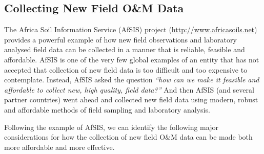 \documentclass[graybox,natbib,nospthms,UStrade]{svmono}
\begin{document}
\hypertarget{collecting-new-field-om-data}{%
\subsection{Collecting New Field O\&M Data}\label{collecting-new-field-om-data}}

The Africa Soil Information Service (AfSIS) project
(\url{http://www.africasoils.net}) provides a
powerful example of how new field observations and laboratory analysed
field data can be collected in a manner that is reliable, feasible and
affordable. AfSIS is one of the very few global examples of an entity
that has not accepted that collection of new field data is too difficult
and too expensive to contemplate. Instead, AfSIS asked the question \emph{``how
can we make it feasible and affordable to collect new, high quality,
field data?''} And then AfSIS (and several partner countries) went ahead
and collected new field data using modern, robust and affordable methods
of field sampling and laboratory analysis.

Following the example of AfSIS, we can identify the following major
considerations for how the collection of new field O\&M data can be made
both more affordable and more effective.
\end{document}
